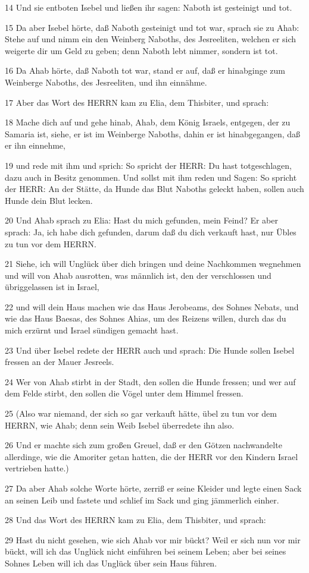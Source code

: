 \par 14 Und sie entboten Isebel und ließen ihr sagen: Naboth ist gesteinigt und tot.
\par 15 Da aber Isebel hörte, daß Naboth gesteinigt und tot war, sprach sie zu Ahab: Stehe auf und nimm ein den Weinberg Naboths, des Jesreeliten, welchen er sich weigerte dir um Geld zu geben; denn Naboth lebt nimmer, sondern ist tot.
\par 16 Da Ahab hörte, daß Naboth tot war, stand er auf, daß er hinabginge zum Weinberge Naboths, des Jesreeliten, und ihn einnähme.
\par 17 Aber das Wort des HERRN kam zu Elia, dem Thisbiter, und sprach:
\par 18 Mache dich auf und gehe hinab, Ahab, dem König Israels, entgegen, der zu Samaria ist, siehe, er ist im Weinberge Naboths, dahin er ist hinabgegangen, daß er ihn einnehme,
\par 19 und rede mit ihm und sprich: So spricht der HERR: Du hast totgeschlagen, dazu auch in Besitz genommen. Und sollst mit ihm reden und Sagen: So spricht der HERR: An der Stätte, da Hunde das Blut Naboths geleckt haben, sollen auch Hunde dein Blut lecken.
\par 20 Und Ahab sprach zu Elia: Hast du mich gefunden, mein Feind? Er aber sprach: Ja, ich habe dich gefunden, darum daß du dich verkauft hast, nur Übles zu tun vor dem HERRN.
\par 21 Siehe, ich will Unglück über dich bringen und deine Nachkommen wegnehmen und will von Ahab ausrotten, was männlich ist, den der verschlossen und übriggelassen ist in Israel,
\par 22 und will dein Haus machen wie das Haus Jerobeams, des Sohnes Nebats, und wie das Haus Baesas, des Sohnes Ahias, um des Reizens willen, durch das du mich erzürnt und Israel sündigen gemacht hast.
\par 23 Und über Isebel redete der HERR auch und sprach: Die Hunde sollen Isebel fressen an der Mauer Jesreels.
\par 24 Wer von Ahab stirbt in der Stadt, den sollen die Hunde fressen; und wer auf dem Felde stirbt, den sollen die Vögel unter dem Himmel fressen.
\par 25 (Also war niemand, der sich so gar verkauft hätte, übel zu tun vor dem HERRN, wie Ahab; denn sein Weib Isebel überredete ihn also.
\par 26 Und er machte sich zum großen Greuel, daß er den Götzen nachwandelte allerdinge, wie die Amoriter getan hatten, die der HERR vor den Kindern Israel vertrieben hatte.)
\par 27 Da aber Ahab solche Worte hörte, zerriß er seine Kleider und legte einen Sack an seinen Leib und fastete und schlief im Sack und ging jämmerlich einher.
\par 28 Und das Wort des HERRN kam zu Elia, dem Thisbiter, und sprach:
\par 29 Hast du nicht gesehen, wie sich Ahab vor mir bückt? Weil er sich nun vor mir bückt, will ich das Unglück nicht einführen bei seinem Leben; aber bei seines Sohnes Leben will ich das Unglück über sein Haus führen.

